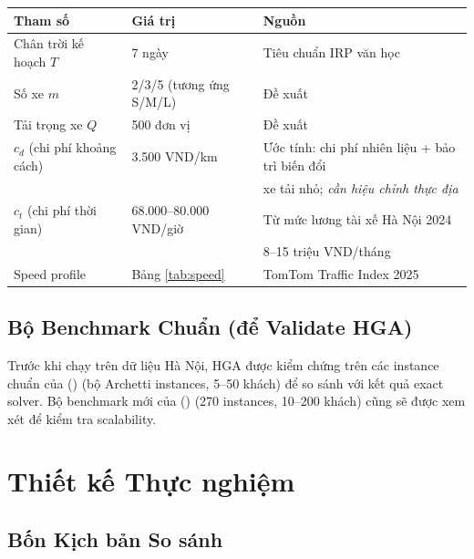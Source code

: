 \documentclass[12pt,a4paper]{article}
\newcommand{\citealias}[1]{\citeauthor{#1} (\citeyear{#1})}
\begin{document}
\begin{center}
\begin{tabular}{lll}
\toprule
Tham số & Giá trị & Nguồn \\
\midrule
Chân trời kế hoạch $T$ & 7 ngày & Tiêu chuẩn IRP văn học \\
Số xe $m$ & 2/3/5 (tương ứng S/M/L) & Đề xuất \\
Tải trọng xe $Q$ & 500 đơn vị & Đề xuất \\
$c_d$ (chi phí khoảng cách) & 3.500 VND/km & Ước tính: chi phí nhiên liệu + bảo trì biến đổi \\
                              &               & xe tải nhỏ; \textit{cần hiệu chỉnh thực địa} \\
$c_t$ (chi phí thời gian) & 68.000--80.000 VND/giờ & Từ mức lương tài xế Hà Nội 2024 \\
                           &                          & 8--15 triệu VND/tháng \citep{jobsgo2024} \\
Speed profile & Bảng \ref{tab:speed} & TomTom Traffic Index 2025 \\
\bottomrule
\end{tabular}
\end{center}

\subsection{Bộ Benchmark Chuẩn (để Validate HGA)}

Trước khi chạy trên dữ liệu Hà Nội, HGA được kiểm chứng trên các instance chuẩn của
\citealias{archetti2007branch} (bộ Archetti instances, 5--50 khách) để so sánh với
kết quả exact solver. Bộ benchmark mới của \citealias{skalnes2024benchmark}
(270 instances, 10--200 khách) cũng sẽ được xem xét để kiểm tra scalability.

\section{Thiết kế Thực nghiệm}

\subsection{Bốn Kịch bản So sánh}
\end{document}
